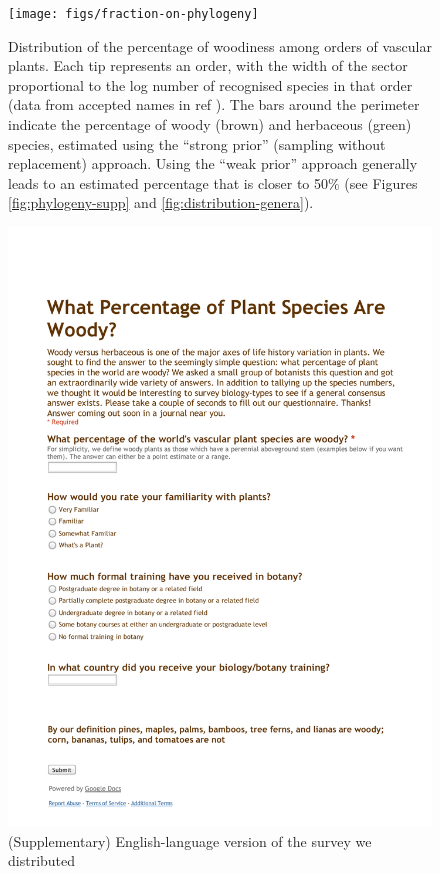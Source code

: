 \documentclass[12pt]{article}
\begin{document}
\begin{figure}[p]
  \centering
  \texttt{[image: figs/fraction-on-phylogeny]}
  \caption{Distribution of the percentage of woodiness among orders of
    vascular plants.  Each tip represents an order, with the width of
    the sector proportional to the log number of recognised species in
    that order (data from accepted names in ref \citep{ThePlantList}).
    The bars around the perimeter indicate the percentage of woody
    (brown) and herbaceous (green) species, estimated using the
    ``strong prior'' (sampling without replacement) approach.  Using
    the ``weak prior'' approach generally leads to an estimated
    percentage that is closer to 50\% (see Figures
    \ref{fig:phylogeny-supp} and \ref{fig:distribution-genera}).}
\label{fig:phylogeny}
\end{figure}

\clearpage
\renewcommand\thefigure{S.\arabic{figure}}
\setcounter{figure}{0}    

\begin{figure}[p]
  \centering
  \vspace{-20ex}
  \includegraphics[scale=0.7]{figs/Survey_supplemental}
  \caption{(Supplementary) English-language version of the survey we
    distributed}
  \label{fig:survey-text}
\end{figure}
\end{document}
